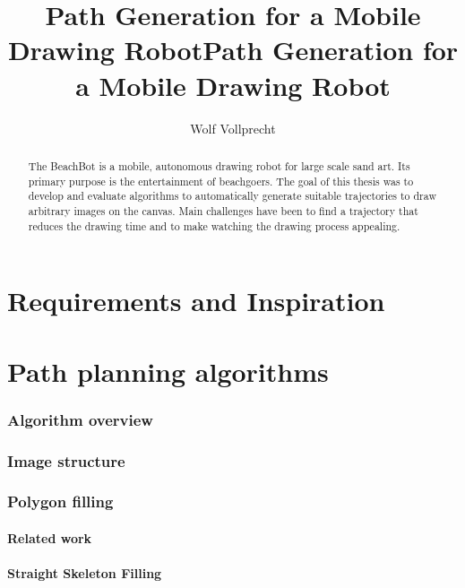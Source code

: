 \documentclass[10pt,twoside,a4paper]{report}
\title{Path Generation for a Mobile Drawing Robot}
\begin{document}
\maketitle
\pagestyle{plain}

\author{Wolf Vollprecht}
\title{Path Generation for a Mobile Drawing Robot}

\begin{abstract}
The BeachBot is a mobile, autonomous drawing robot for large scale sand art. Its primary purpose is the entertainment of beachgoers. The goal of this thesis was to develop and evaluate algorithms to automatically generate suitable trajectories to draw arbitrary images on the canvas. Main challenges have been to find a trajectory that reduces the drawing time and to make watching the drawing process appealing.
\end{abstract}



\chapter{Requirements and Inspiration}


\chapter{Path planning algorithms}
\subsection{Algorithm overview}
\subsection{Image structure}%
\subsection{Polygon filling}
\subsubsection{Related work}
\subsubsection{Straight Skeleton Filling}
\end{document}
